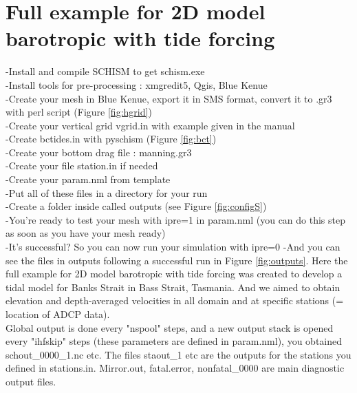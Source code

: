 \documentclass[preprints,briefreport,accept,oneauthor,pdftex]{Definitions/mdpi}
\begin{document}
\section{Full example for 2D model barotropic with tide forcing}
\noindent -Install and compile SCHISM to get schism.exe\\
-Install tools for pre-processing : xmgredit5, Qgis, Blue Kenue\\
-Create your mesh in Blue Kenue, export it in SMS format, convert it to .gr3 with perl script (Figure \ref{fig:hgrid})\\
-Create your vertical grid vgrid.in with example given in the manual\\
-Create bctides.in with pyschism (Figure \ref{fig:bct})\\
-Create your bottom drag file : manning.gr3\\
-Create your file station.in if needed\\
-Create your param.nml from template \\
-Put all of these files in a directory for your run\\
-Create a folder inside called outputs (see Figure \ref{fig:configS})\\
-You're ready to test your mesh with ipre=1 in param.nml (you can do this step as soon as you have your mesh ready)\\
-It's successful? So you can now run your simulation with ipre=0
-And you can see the files in outputs following a successful run in Figure \ref{fig:outputs}. 
Here the full example for 2D model barotropic with tide forcing was created to develop a tidal model for Banks Strait in Bass Strait, Tasmania. And we aimed to obtain elevation and depth-averaged velocities in all domain and at specific stations (= location of ADCP data).\\
Global output is done every "nspool" steps, and a new output stack is opened every "ihfskip" steps (these parameters are defined in param.nml), you obtained schout\_0000\_1.nc etc. The files staout\_1 etc are the outputs for the stations you defined in stations.in. Mirror.out, fatal.error, nonfatal\_0000 are main diagnostic output files.\\
\end{document}

